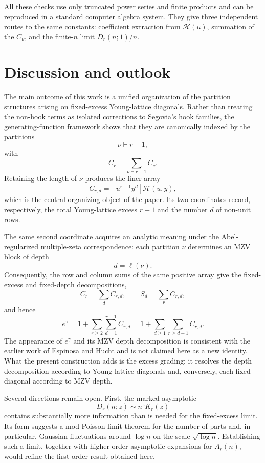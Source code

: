 \documentclass[11pt]{article}
\theoremstyle{definition}
\begin{document}
All these checks use only truncated power series and finite products
and can be reproduced in a standard computer algebra system.  They
give three independent routes to the same constants: coefficient
extraction from $\mathcal H(u)$, summation of the $C_\nu$, and the
finite-$n$ limit $D_r(n;1)/n$.

\section{Discussion and outlook}
\label{sec:discussion}

The main outcome of this work is a unified organization of the
partition structures arising on fixed-excess Young-lattice
diagonals.  Rather than treating the non-hook terms as isolated
corrections to Segovia's hook families, the generating-function
framework shows that they are canonically indexed by the partitions
\[
        \nu\vdash r-1,
\]
with
\[
        C_r=\sum_{\nu\vdash r-1}C_\nu.
\]
Retaining the length of $\nu$ produces the finer array
\[
        C_{r,d}
        =
        [u^{r-1}y^d]\mathscr H(u,y),
\]
which is the central organizing object of the paper.  Its two
coordinates record, respectively, the total Young-lattice excess
$r-1$ and the number $d$ of non-unit rows.

The same second coordinate acquires an analytic meaning under the
Abel-regularized multiple-zeta correspondence: each partition $\nu$
determines an MZV block of depth
\[
        d=\ell(\nu).
\]
Consequently, the row and column sums of the same positive array give
the fixed-excess and fixed-depth decompositions,
\[
        C_r=\sum_d C_{r,d},
        \qquad
        S_d=\sum_r C_{r,d},
\]
and hence
\[
 e^\gamma
 =
 1+\sum_{r\geq2}\sum_{d=1}^{r-1}C_{r,d}
 =
 1+\sum_{d\geq1}\sum_{r\geq d+1}C_{r,d}.
\]
The appearance of $e^\gamma$ and its MZV depth decomposition is
consistent with the earlier work of Espinosa and Hucht and is not
claimed here as a new identity.  What the present construction adds
is the excess grading: it resolves the depth decomposition according
to Young-lattice diagonals and, conversely, each fixed diagonal
according to MZV depth.

Several directions remain open.  First, the marked asymptotic
\[
        D_r(n;z)\sim n^zK_r(z)
\]
contains substantially more information than is needed for the
fixed-excess limit.  Its form suggests a mod-Poisson limit theorem
for the number of parts and, in particular, Gaussian fluctuations
around $\log n$ on the scale $\sqrt{\log n}$.  Establishing such a
limit, together with higher-order asymptotic expansions for
$A_r(n)$, would refine the first-order result obtained here.
\end{document}
